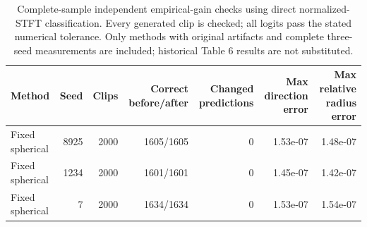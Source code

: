 \begin{table}[t]\centering\small
\begin{tabular}{lrrrrrr}
\toprule
Method & Seed & Clips & Correct before/after & Changed predictions & Max direction error & Max relative radius error \\
\midrule
Fixed spherical & 8925 & 2000 & 1605/1605 & 0 & 1.53e-07 & 1.48e-07 \\
Fixed spherical & 1234 & 2000 & 1601/1601 & 0 & 1.45e-07 & 1.42e-07 \\
Fixed spherical & 7 & 2000 & 1634/1634 & 0 & 1.53e-07 & 1.54e-07 \\
\bottomrule\end{tabular}
\caption{Complete-sample independent empirical-gain checks using direct normalized-STFT classification. Every generated clip is checked; all logits pass the stated numerical tolerance. Only methods with original artifacts and complete three-seed measurements are included; historical Table 6 results are not substituted.}
\label{tab:audio-complete-gain-controls}\end{table}
